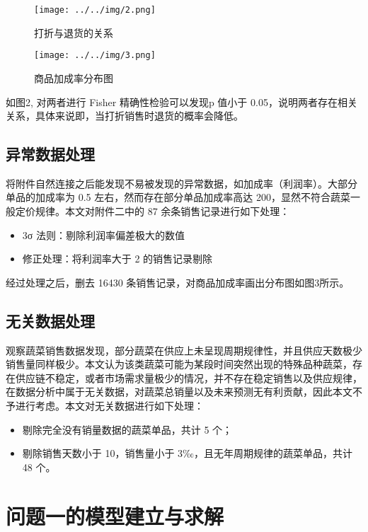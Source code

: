 \documentclass[withoutpreface,bwprint]{cumcmthesis} %
\begin{document}
\begin{figure}[H]
    \small
    \centering
    \texttt{[image: ../../img/2.png]}
    \caption{打折与退货的关系}
	\label{fig2}
\end{figure}

\begin{figure}[H]
    \small
    \centering
    \texttt{[image: ../../img/3.png]}
    \caption{商品加成率分布图}
	\label{fig3}
\end{figure}

如图2, 对两者进行 Fisher 精确性检验可以发现p 值小于 0.05，说明两者存在相关关系，具体来说即，当打折销售时退货的概率会降低。

\subsection{异常数据处理}

将附件自然连接之后能发现不易被发现的异常数据，如加成率（利润率）。大部分单品的加成率为 0.5 左右，然而存在部分单品加成率高达 200，显然不符合蔬菜一般定价规律。本文对附件二中的 87 余条销售记录进行如下处理：
\begin{itemize}
    \item 3σ 法则：剔除利润率偏差极大的数值
    \item 修正处理：将利润率大于 2 的销售记录剔除
\end{itemize}

经过处理之后，删去 16430 条销售记录，对商品加成率画出分布图如图3所示。


\subsection{无关数据处理}

观察蔬菜销售数据发现，部分蔬菜在供应上未呈现周期规律性，并且供应天数极少销售量同样极少。本文认为该类蔬菜可能为某段时间突然出现的特殊品种蔬菜，存在供应链不稳定，或者市场需求量极少的情况，并不存在稳定销售以及供应规律，在数据分析中属于无关数据，对蔬菜总销量以及未来预测无有利贡献，因此本文不予进行考虑。本文对无关数据进行如下处理：
\begin{itemize}
	\item 剔除完全没有销量数据的蔬菜单品，共计 5 个；
	\item 剔除销售天数小于 10，销售量小于 3‰，且无年周期规律的蔬菜单品，共计 48 个。
\end{itemize}

\section{问题一的模型建立与求解}
\end{document}
